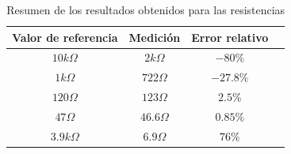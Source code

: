\documentclass[a4paper,10pt]{article}
\begin{document}
		\begin{table}[!htp]
			\centering
			\begin{tabular}{|c|c|c|c|}
				\hline
    			Valor de referencia & Medici\'on & Error relativo \\
				\hline
				$10k\Omega$ & $2k\Omega$ &$-80 \% $ \\
				\hline 
				$1k\Omega$ & $722\Omega$ &$-27.8\%$\\
				\hline
				$120\Omega$ & $123\Omega$ &$2.5\% $ \\
				\hline
				$47\Omega$ & $46.6\Omega$ &$0.85\% $ \\
				\hline
				$3.9k\Omega$ & $6.9\Omega$ &$76\% $  \\
				\hline								
			\end{tabular}
			\caption{Resumen de los resultados obtenidos para las resistencias} 
			\label{tab001}
		\end{table}
		
						
\end{document}
